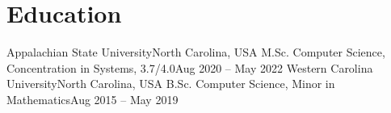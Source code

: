 \section{Education}
  \resumeSubHeadingListStart
    \resumeSubheading
      {Appalachian State University}{North Carolina, USA}
      {M.Sc. Computer Science, Concentration in Systems, 3.7/4.0}{Aug 2020 -- May 2022}
      \resumeItemListStart
      \resumeItemListEnd
    \resumeSubheading
      {Western Carolina University}{North Carolina, USA}
      {B.Sc. Computer Science, Minor in Mathematics}{Aug 2015 -- May 2019}
      \resumeItemListStart
      \resumeItemListEnd
  \resumeSubHeadingListEnd
